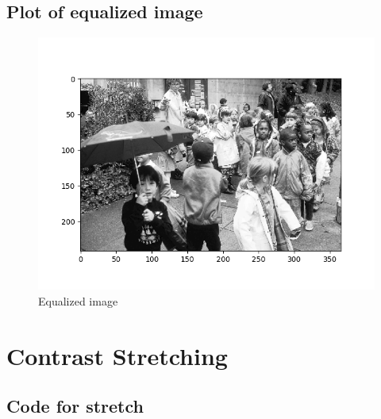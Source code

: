 \documentclass{article}
\begin{document}
\subsection{Plot of equalized image}
\begin{figure}[H]
    \centering
    \includegraphics[width=1\textwidth]{../kids-equalized-image.png}
    \caption{Equalized image}
\end{figure}



\section{Contrast Stretching}
\subsection{Code for stretch}

\end{document}
